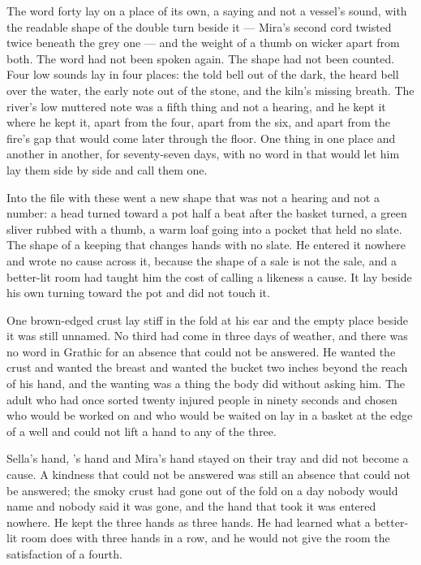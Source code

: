 The word forty lay on a place of its own, a saying and not a vessel's sound, with the readable shape of the double turn beside it --- Mira's second cord twisted twice beneath the grey one --- and the weight of a thumb on wicker apart from both. The word had not been spoken again. The shape had not been counted. Four low sounds lay in four places: the told bell out of the dark, the heard bell over the water, the early note out of the stone, and the kiln's missing breath. The river's low muttered note was a fifth thing and not a hearing, and he kept it where he kept it, apart from the four, apart from the six, and apart from the fire's gap that would come later through the floor. One thing in one place and another in another, for seventy-seven days, with no word in  that would let him lay them side by side and call them one.

Into the file with these went a new shape that was not a hearing and not a number: a head turned toward a pot half a beat after the basket turned, a green sliver rubbed with a thumb, a warm loaf going into a pocket that held no slate. The shape of a keeping that changes hands with no slate. He entered it nowhere and wrote no cause across it, because the shape of a sale is not the sale, and a better-lit room had taught him the cost of calling a likeness a cause. It lay beside his own turning toward the pot and did not touch it.

One brown-edged crust lay stiff in the fold at his ear and the empty place beside it was still unnamed. No third had come in three days of weather, and there was no word in Grathic for an absence that could not be answered. He wanted the crust and wanted the breast and wanted the bucket two inches beyond the reach of his hand, and the wanting was a thing the body did without asking him. The adult who had once sorted twenty injured people in ninety seconds and chosen who would be worked on and who would be waited on lay in a basket at the edge of a well and could not lift a hand to any of the three.

Sella's hand, 's hand and Mira's hand stayed on their tray and did not become a cause. A kindness that could not be answered was still an absence that could not be answered; the smoky crust had gone out of the fold on a day nobody would name and nobody said it was gone, and the hand that took it was entered nowhere. He kept the three hands as three hands. He had learned what a better-lit room does with three hands in a row, and he would not give the room the satisfaction of a fourth.

